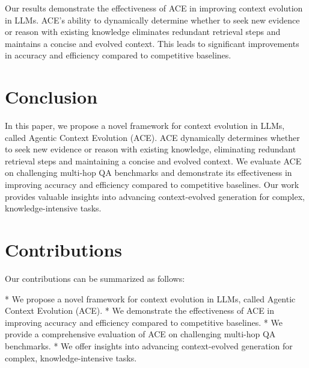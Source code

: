 \documentclass{article}
\begin{document}
Our results demonstrate the effectiveness of ACE in improving context evolution in LLMs. ACE's ability to dynamically determine whether to seek new evidence or reason with existing knowledge eliminates redundant retrieval steps and maintains a concise and evolved context. This leads to significant improvements in accuracy and efficiency compared to competitive baselines.

\section{Conclusion}

In this paper, we propose a novel framework for context evolution in LLMs, called Agentic Context Evolution (ACE). ACE dynamically determines whether to seek new evidence or reason with existing knowledge, eliminating redundant retrieval steps and maintaining a concise and evolved context. We evaluate ACE on challenging multi-hop QA benchmarks and demonstrate its effectiveness in improving accuracy and efficiency compared to competitive baselines. Our work provides valuable insights into advancing context-evolved generation for complex, knowledge-intensive tasks.

\section{Contributions}

Our contributions can be summarized as follows:

* We propose a novel framework for context evolution in LLMs, called Agentic Context Evolution (ACE).
* We demonstrate the effectiveness of ACE in improving accuracy and efficiency compared to competitive baselines.
* We provide a comprehensive evaluation of ACE on challenging multi-hop QA benchmarks.
* We offer insights into advancing context-evolved generation for complex, knowledge-intensive tasks.
\end{document}
